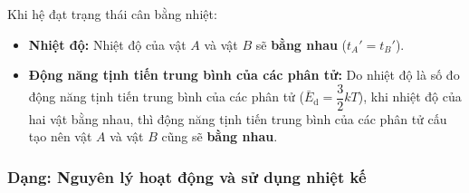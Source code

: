 \begin{vidumau}
{\begin{enumerate}
			Khi hệ đạt trạng thái cân bằng nhiệt:
			\begin{itemize}
				\item \textbf{Nhiệt độ:} Nhiệt độ của vật $A$ và vật $B$ sẽ \textbf{bằng nhau} ($t_A' = t_B'$).
				\item \textbf{Động năng tịnh tiến trung bình của các phân tử:} Do nhiệt độ là số đo động năng tịnh tiến trung bình của các phân tử ($\bar{E}_{\mathrm{d}} = \dfrac{3}{2} k T$), khi nhiệt độ của hai vật bằng nhau, thì động năng tịnh tiến trung bình của các phân tử cấu tạo nên vật $A$ và vật $B$ cũng sẽ \textbf{bằng nhau}.
			\end{itemize}
		\end{enumerate}
	}
\end{vidumau}

\subsubsection{Dạng: Nguyên lý hoạt động và sử dụng nhiệt kế}
